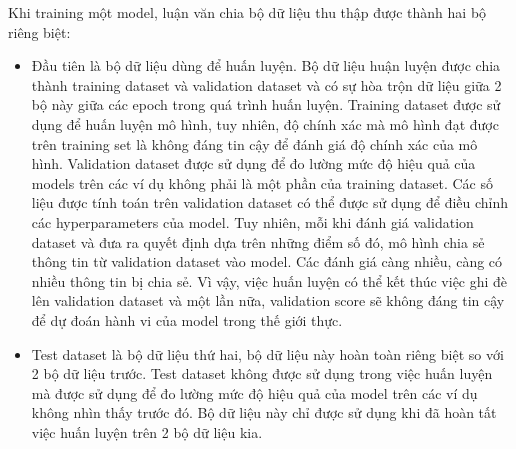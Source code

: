 Khi training một model, luận văn chia bộ dữ liệu thu thập được thành hai bộ riêng biệt:
\begin{itemize}
\item Đầu tiên là bộ dữ liệu dùng để huấn luyện. Bộ dữ liệu huận luyện được chia thành training dataset và validation dataset và có sự hòa trộn dữ liệu giữa 2 bộ này giữa các epoch trong quá trình huấn luyện. Training dataset được sử dụng để huấn luyện mô hình, tuy nhiên, độ chính xác mà mô hình đạt được trên training set là không đáng tin cậy để đánh giá độ chính xác của mô hình. Validation dataset được sử dụng để đo lường mức độ hiệu quả của models trên các ví dụ không phải là một phần của training dataset. Các số liệu được tính toán trên validation dataset có thể được sử dụng để điều chỉnh các hyperparameters của model. Tuy nhiên, mỗi khi đánh giá validation dataset và đưa ra quyết định dựa trên những điểm số đó, mô hình chia sẻ thông tin từ validation dataset vào model. Các đánh giá càng nhiều, càng có nhiều thông tin bị chia sẻ. Vì vậy, việc huấn luyện có thể kết thúc việc ghi đè lên validation dataset và một lần nữa, validation score sẽ không đáng tin cậy để dự đoán hành vi của model trong thế giới thực.

\item Test dataset là bộ dữ liệu thứ hai, bộ dữ liệu này hoàn toàn riêng biệt so với 2 bộ dữ liệu trước. Test dataset không được sử dụng trong việc huấn luyện mà được sử dụng để đo lường mức độ hiệu quả của model trên các ví dụ không nhìn thấy trước đó. Bộ dữ liệu này chỉ được sử dụng khi đã hoàn tất việc huấn luyện trên 2 bộ dữ liệu kia.
\end{itemize}

